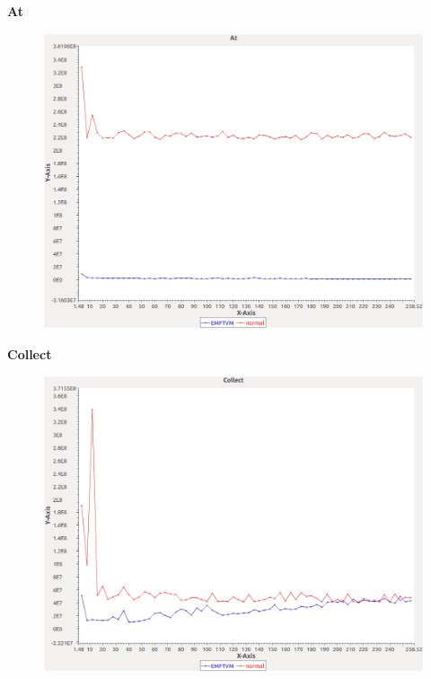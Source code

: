 \noindent\textbf{At}

\begin{figure}[h]
\centering
\includegraphics[width=\textwidth]{../graphs/sequence/At}
\end{figure}
\pagebreak

\noindent\textbf{Collect}

\begin{figure}[h]
\centering
\includegraphics[width=\textwidth]{../graphs/sequence/Collect}
\end{figure}
\pagebreak

